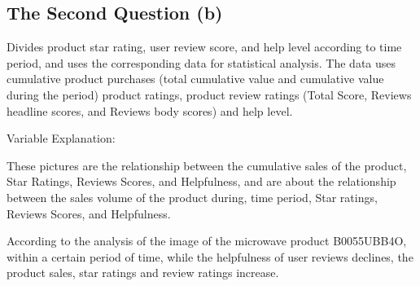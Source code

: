 \documentclass[12pt]{article}
\begin{document}
\subsection{The Second Question (b)}
\quad\par\par
Divides product star rating, user review score, and help level according to time period, and uses the corresponding data for statistical analysis. The data uses cumulative product purchases (total cumulative value and cumulative value during the period) product ratings, product review ratings (Total Score, Reviews headline scores, and Reviews body scores) and help level.
\par
Variable Explanation:
\par\quad\par\quad\par\quad\par\quad\par\quad\par\quad\par\quad\par\quad\par\quad\par\quad\par
\par
These pictures are the relationship between the cumulative sales of the product, Star Ratings, Reviews Scores, and Helpfulness, and are about the relationship between the sales volume of the product during, time period, Star ratings, Reviews Scores, and Helpfulness.
\par\par\quad\par\quad\par\quad\par\quad\par\quad\par\quad\par\quad\par\quad\par\quad\par\quad\par
According to the analysis of the image of the microwave product B0055UBB4O, within a certain period of time, while the helpfulness of user reviews declines, the product sales, star ratings and review ratings increase.
\par\par\quad\par\quad\par\quad\par\quad\par\quad\par\quad\par\quad\par\quad\par\quad\par\quad\par
\end{document}
